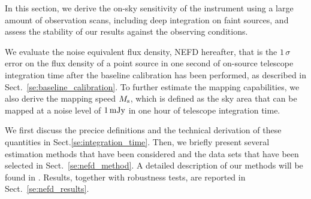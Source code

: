 
%

In this section, we derive the on-sky sensitivity of the instrument
using a large amount of observation scans, including deep integration
on faint sources, and assess the stability of our results against the
observing conditions.

We evaluate the noise equivalent flux density, NEFD hereafter, that is
the $1\,\sigma$ error on the flux
density of a point source in one second of on-source telescope
integration time after the baseline calibration has been performed, as
described in Sect.~\ref{se:baseline_calibration}. To further estimate
the mapping capabilities, we also derive the mapping speed
$M_{\rm{s}}$, which is defined as the sky area that can
be mapped at a noise level of $1\,\rm{mJy}$ in one hour of telescope 
integration time.

We first discuss the precice definitions and the technical derivation
of these quantities in Sect.\ref{se:integration_time}.
Then, we briefly present several estimation methods that have been
considered and the data sets that have been selected in
Sect.~\ref{se:nefd_method}. A detailed
description of our methods will be found in \citet{Ponthieu2019}.
Results, together with robustness tests, are reported in Sect.~\ref{se:nefd_results}.

